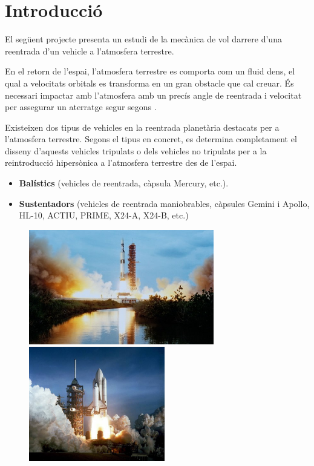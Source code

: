 
\section{Introducció}

El següent projecte presenta un estudi de la mecànica de vol darrere d'una reentrada d'un vehicle a l'atmosfera terrestre.

En el retorn de l'espai, l'atmosfera terrestre es comporta com un fluid dens, el qual a velocitats orbitals es transforma en un gran obstacle que cal creuar. És necessari impactar amb l'atmosfera amb un precís angle de reentrada i velocitat per assegurar un aterratge segur segons \cite{archivo2}. 

Existeixen dos tipus de vehicles en la reentrada planetària destacats per \cite{adams} a l'atmosfera terrestre. Segons el tipus en concret, es determina completament el disseny d'aquests vehicles tripulats o dels vehicles no tripulats per a la reintroducció hipersònica a l'atmosfera terrestre des de l’espai.
\begin{itemize}
    \item \textbf{Balístics} (vehicles de reentrada, càpsula Mercury, etc.).
    \item \textbf{Sustentadors} (vehicles de reentrada maniobrables, càpsules Gemini i Apollo, HL-10, ACTIU, PRIME, X24-A, X24-B, etc.)
\end{itemize}

\begin{figure}[h]
    \centering
    \begin{minipage}{.55\textwidth}
        \centering
        \includegraphics[height=5cm]{imagenes/00_general/saturnv.jpg}
    \end{minipage}%
    \begin{minipage}{.45\textwidth}
        \centering
        \includegraphics[height=5cm]{imagenes/00_general/spaceshuttle.jpg}
    \end{minipage}
\end{figure}





